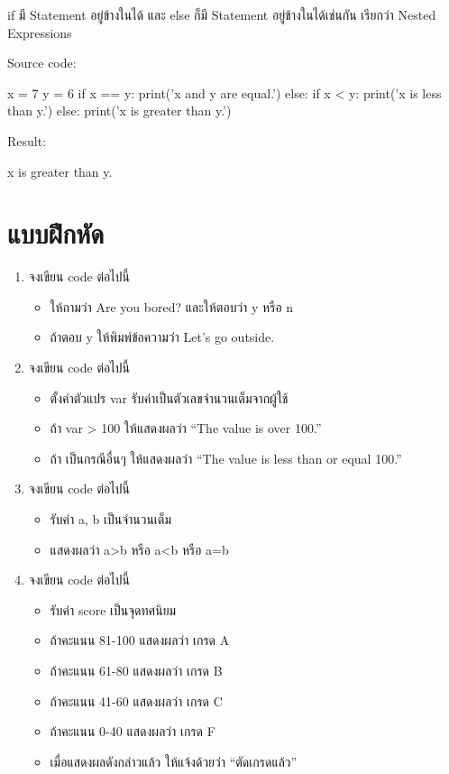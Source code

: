 if มี Statement อยู่ข้างในได้ และ else ก็มี Statement อยู่ข้างในได้เช่นกัน เรียกว่า Nested Expressions

Source code:
\begin{pycode}
x = 7
y = 6
if x == y: print('x and y are equal.')
else:
    if x < y: print('x is less than y.')
    else: print('x is greater than y.')
\end{pycode}

Result:
\begin{pycode}
x is greater than y.
\end{pycode}

\section{แบบฝึกหัด}

\begin{enumerate} 
\item  จงเขียน code ต่อไปนี้
\begin{itemize}
\item ให้ถามว่า Are you bored? และให้ตอบว่า y หรือ n
\item ถ้าตอบ y ให้พิมพ์ข้อความว่า Let’s go outside.
\end{itemize}
\item จงเขียน code ต่อไปนี้
\begin{itemize}
\item ตั้งค่าตัวแปร var รับค่าเป็นตัวเลขจำนวนเต็มจากผู้ใช้
\item ถ้า var > 100 ให้แสดงผลว่า “The value is over 100.”
\item ถ้า เป็นกรณีอื่นๆ ให้แสดงผลว่า “The value is less than or equal 100.”
\end{itemize}
\item จงเขียน code ต่อไปนี้
\begin{itemize}
\item รับค่า a, b เป็นจำนวนเต็ม
\item แสดงผลว่า a>b หรือ a<b หรือ a=b
\end{itemize}
\item จงเขียน code ต่อไปนี้
\begin{itemize}
\item รับค่า score เป็นจุดทศนิยม
\item ถ้าคะแนน 81-100 แสดงผลว่า เกรด A
\item ถ้าคะแนน 61-80  แสดงผลว่า เกรด B
\item ถ้าคะแนน 41-60 แสดงผลว่า เกรด C
\item ถ้าคะแนน 0-40 แสดงผลว่า เกรด F
\item เมื่อแสดงผลดังกล่าวแล้ว ให้แจ้งด้วยว่า “ตัดเกรดแล้ว”
\end{itemize}
\end{enumerate}
